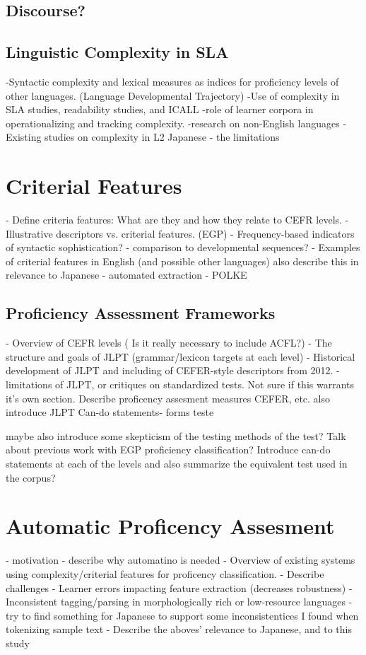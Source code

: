 \subsection{Discourse?}

\subsection{Linguistic Complexity in SLA}
-Syntactic complexity and lexical measures as indices for proficiency levels of other languages. (Language Developmental Trajectory)
-Use of complexity in SLA studies, readability studies, and ICALL
-role of learner corpora in operationalizing and tracking complexity.
-research on non-English languages
-Existing studies on complexity in L2 Japanese - the limitations



\section{Criterial Features}
- Define criteria features: What are they and how they relate to CEFR levels.
- Illustrative descriptors vs. criterial features. (EGP)
- Frequency-based indicators of syntactic sophistication? \cite{Ellis2004}
    - comparison to developmental sequences?
- Examples of criterial features in English (and possible other languages) also describe this in relevance to Japanese
- automated extraction - POLKE


\subsection{Proficiency Assessment Frameworks}
- Overview of CEFR levels ( Is it really necessary to include ACFL?)
- The structure and goals of JLPT (grammar/lexicon targets at each level)
- Historical development of JLPT and including of CEFER-style descriptors from 2012.
- limitations of JLPT, or critiques on standardized tests.
Not sure if this warrants it's own section. Describe proficency assesment measures CEFER, etc. also introduce JLPT
Can-do statements- forms teste


maybe also introduce some skepticism of the testing methods of the test?
Talk about previous work with EGP proficiency classification?
Introduce can-do statements at each of the levels and also summarize the equivalent test used in the corpus?


\section{Automatic Proficency Assesment}
- motivation - describe why automatino is needed
- Overview of existing systems using complexity/criterial features for proficency classification.
- Describe challenges
    - Learner errors impacting feature extraction (decreases robustness)
    -Inconsistent tagging/parsing in morphologically rich or low-resource languages
        -try to find something for Japanese to support some inconsistentices I found when tokenizing sample text
- Describe the aboves' relevance to Japanese, and to this study


